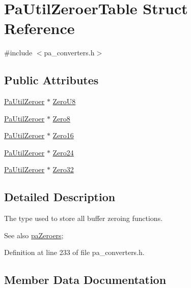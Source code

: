 \hypertarget{struct_pa_util_zeroer_table}{}\section{Pa\+Util\+Zeroer\+Table Struct Reference}
\label{struct_pa_util_zeroer_table}


{\ttfamily \#include $<$pa\+\_\+converters.\+h$>$}

\subsection*{Public Attributes}
\begin{DoxyCompactItemize}
\item 
\hyperlink{pa__converters_8h_a6f0dab7cde48b5f41801024ed20be7e7}{Pa\+Util\+Zeroer} $\ast$ \hyperlink{struct_pa_util_zeroer_table_ac1c2f1378f4ef904a85f068f89e6cfac}{Zero\+U8}
\item 
\hyperlink{pa__converters_8h_a6f0dab7cde48b5f41801024ed20be7e7}{Pa\+Util\+Zeroer} $\ast$ \hyperlink{struct_pa_util_zeroer_table_a2d49dbb7533f517c11cbd1e262d5ce25}{Zero8}
\item 
\hyperlink{pa__converters_8h_a6f0dab7cde48b5f41801024ed20be7e7}{Pa\+Util\+Zeroer} $\ast$ \hyperlink{struct_pa_util_zeroer_table_abfca3a1322dcf1895946fe75ec3fc73d}{Zero16}
\item 
\hyperlink{pa__converters_8h_a6f0dab7cde48b5f41801024ed20be7e7}{Pa\+Util\+Zeroer} $\ast$ \hyperlink{struct_pa_util_zeroer_table_aad3b88d178671fa2ba7e0eb034aa3f72}{Zero24}
\item 
\hyperlink{pa__converters_8h_a6f0dab7cde48b5f41801024ed20be7e7}{Pa\+Util\+Zeroer} $\ast$ \hyperlink{struct_pa_util_zeroer_table_a94e1a6aa731b624e5fb8f12296f1dea5}{Zero32}
\end{DoxyCompactItemize}


\subsection{Detailed Description}
The type used to store all buffer zeroing functions. \begin{DoxySeeAlso}{See also}
\hyperlink{pa__converters_8h_a5c96b77dd6fb2969291dbbb09c5fec94}{pa\+Zeroers}; 
\end{DoxySeeAlso}


Definition at line 233 of file pa\+\_\+converters.\+h.



\subsection{Member Data Documentation}
